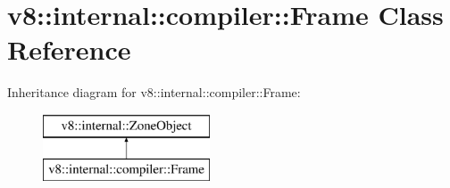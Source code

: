 \hypertarget{classv8_1_1internal_1_1compiler_1_1_frame}{}\section{v8\+:\+:internal\+:\+:compiler\+:\+:Frame Class Reference}
\label{classv8_1_1internal_1_1compiler_1_1_frame}
Inheritance diagram for v8\+:\+:internal\+:\+:compiler\+:\+:Frame\+:\begin{figure}[H]
\begin{center}
\leavevmode
\includegraphics[height=2.000000cm]{classv8_1_1internal_1_1compiler_1_1_frame}
\end{center}
\end{figure}

